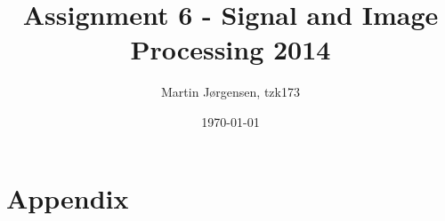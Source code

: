 \documentclass[a4paper,11pt]{article}
\title{Assignment 6 - Signal and Image Processing 2014}
\author{Martin Jørgensen, tzk173}
\date{\today}
\begin{document}
\maketitle

\tableofcontents
\pagebreak



%



\appendix
\section{Appendix}

\end{document}
